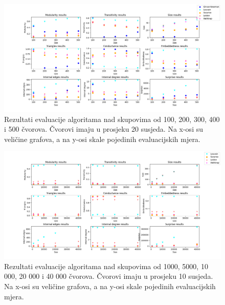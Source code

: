 \documentclass[times, utf8, diplomski]{fer}
\begin{document}
\begin{figure}
	\includegraphics[width=\linewidth]{images/test1.png}
	\caption{Rezultati evaluacije algoritama nad skupovima od 100, 200, 300, 400 i 500 čvorova. Čvorovi imaju u prosjeku 20 susjeda. Na x-osi su veličine grafova, a na y-osi skale pojedinih evaluacijskih mjera.}
	\label{fig:test1}
\end{figure}

\begin{figure}[!b]
	\includegraphics[width=\linewidth]{images/test2_10.png}
	\caption{Rezultati evaluacije algoritama nad skupovima od 1000, 5000, 10 000, 20 000 i 40 000 čvorova. Čvorovi imaju u prosjeku 10 susjeda. Na x-osi su veličine grafova, a na y-osi skale pojedinih evaluacijskih mjera.}
	\label{fig:test2_10}
\end{figure}
\end{document}
